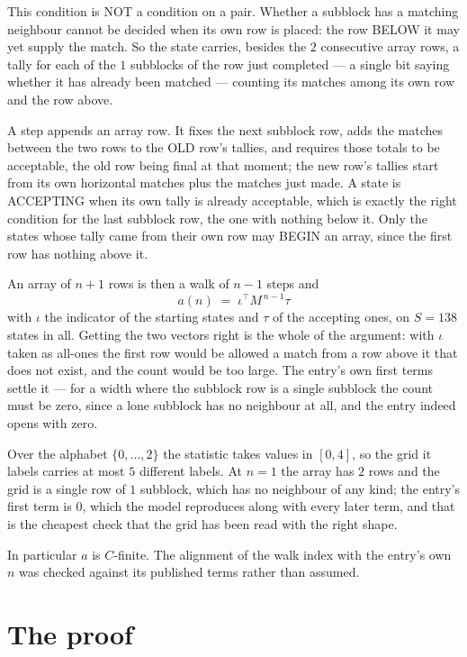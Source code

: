 \documentclass[11pt,a4paper]{article}
\theoremstyle{plain}
\theoremstyle{definition}
\begin{document}
This condition is NOT a condition on a pair. Whether a subblock has a
matching neighbour cannot be decided when its own row is placed: the row BELOW it may yet
supply the match. So the state carries, besides the $2$ consecutive array rows, a tally for
each of the $1$ subblocks of the row just completed --- a single bit saying whether it has already been matched --- counting its matches
among its own row and the row above.

A step appends an array row. It fixes the next subblock row, adds the matches between the two
rows to the OLD row's tallies, and requires those totals to be acceptable, the old row being
final at that moment; the new row's tallies start from its own horizontal matches plus the
matches just made. A state is ACCEPTING when its own tally is already acceptable, which is
exactly the right condition for the last subblock row, the one with nothing below it. Only the
states whose tally came from their own row may BEGIN an array, since the first row has nothing
above it.

An array of $n+1$ rows is then a walk of $n-1$ steps and
\[
a(n)\;=\;\iota^{\!\top}M^{\,n-1}\tau
\]
with $\iota$ the indicator of the starting states and $\tau$ of the accepting ones, on
$S=138$ states in all. Getting the two vectors right is the whole of the argument: with
$\iota$ taken as all-ones the first row would be allowed a match from a row above it that does
not exist, and the count would be too large. The entry's own first terms settle it --- for
a width where the subblock row is a single subblock
the count must be zero, since a lone subblock has no neighbour at all, and the entry indeed opens with zero.

Over the alphabet $\{0,\dots,2\}$ the statistic takes values in $[0,4]$, so the
grid it labels carries at most $5$ different labels. At $n=1$ the array has $2$
rows and the grid is a single row of $1$
subblock, which has no neighbour of any kind; the entry's first term is
$0$, which the model reproduces along with every later term, and that is the cheapest
check that the grid has been read with the right shape.

In particular $a$ is $C$-finite. The alignment of the walk index with the entry's own $n$ was
checked against its published terms rather than assumed.

\section{The proof}
\end{document}
